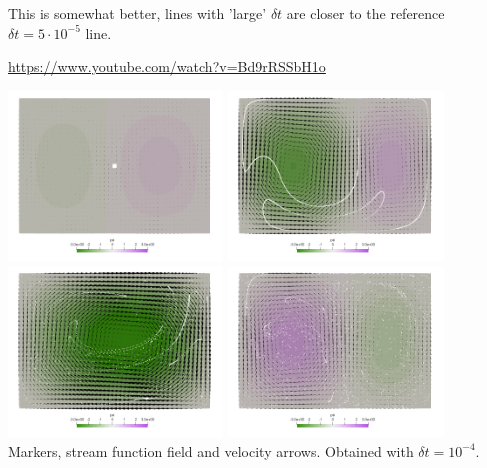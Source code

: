 This is somewhat better, lines with 'large' $\delta t$ are closer to the reference
$\delta t=5\cdot 10^{-5}$ line. 

\url{https://www.youtube.com/watch?v=Bd9rRSSbH1o}


\begin{center}
\includegraphics[width=5.7cm]{python_codes/fieldstone_156/results/scheme2/psi0000}
\includegraphics[width=5.7cm]{python_codes/fieldstone_156/results/scheme2/psi0100}\\
\includegraphics[width=5.7cm]{python_codes/fieldstone_156/results/scheme2/psi0200}
\includegraphics[width=5.7cm]{python_codes/fieldstone_156/results/scheme2/psi0300}\\
{\captionfont Markers, stream function field and velocity arrows. Obtained with $\delta t=10^{-4}$.}
\end{center}

